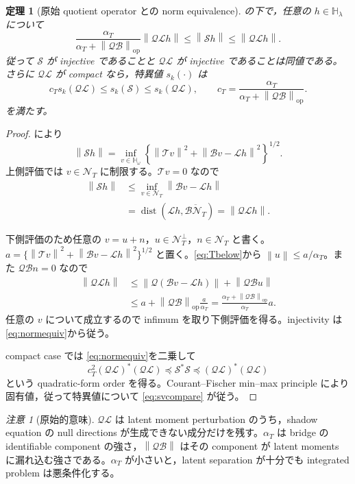 \documentclass[11pt,a4paper]{ltjsarticle}
\newtheorem{theorem}{定理}[section]
\theoremstyle{remark}
\newtheorem{remark}{注意}[section]
\newcommand{\norm}[1]{\left\lVert#1\right\rVert}
\newcommand{\cN}{\mathcal N}
\newcommand{\Top}{\mathscr T}
\newcommand{\Bop}{\mathscr B}
\newcommand{\Lop}{\mathscr L}
\newcommand{\Sop}{\mathscr S}
\newcommand{\Qop}{\mathscr Q}
\newcommand{\dist}{\operatorname{dist}}
\newcommand{\op}{\operatorname{op}}
\begin{document}
\begin{theorem}[原始 quotient operator との norm equivalence]\label{thm:primitiveSV}
の下で，任意の $h\in\mathbb H_\lambda$ について
\begin{equation}
\frac{\alpha_T}{\alpha_T+\norm{\Qop\Bop}_{\op}}
\norm{\Qop\Lop h}
\le
\norm{\Sop h}
\le
\norm{\Qop\Lop h}.
\label{eq:normequiv}
\end{equation}
従って $\Sop$ が injective であることと $\Qop\Lop$ が injective であることは同値である。さらに $\Qop\Lop$ が compact なら，特異値 $s_k(\cdot)$ は
\begin{equation}
 c_T s_k(\Qop\Lop)
\le s_k(\Sop)\le s_k(\Qop\Lop),
\qquad
c_T=\frac{\alpha_T}{\alpha_T+\norm{\Qop\Bop}_{\op}}.
\label{eq:svcompare}
\end{equation}
を満たす。
\end{theorem}

\begin{proof}
により
\[
\norm{\Sop h}
=\inf_{v\in\mathbb H_\omega}
\left\{\norm{\Top v}^2+\norm{\Bop v-\Lop h}^2\right\}^{1/2}.
\]
上側評価では $v\in\cN_T$ に制限する。$\Top v=0$ なので
\begin{align*}
\norm{\Sop h}
&\le \inf_{v\in\cN_T}\norm{\Bop v-\Lop h}\\
&=\dist(\Lop h,\overline{\Bop\cN_T})
=\norm{\Qop\Lop h}.
\end{align*}

下側評価のため任意の $v=u+n$，$u\in\cN_T^\perp$，$n\in\cN_T$ と書く。$a=\{\norm{\Top v}^2+\norm{\Bop v-\Lop h}^2\}^{1/2}$ と置く。\eqref{eq:Tbelow}から $\norm u\le a/\alpha_T$。また $\Qop\Bop n=0$ なので
\begin{align*}
\norm{\Qop\Lop h}
&\le\norm{\Qop(\Bop v-\Lop h)}+\norm{\Qop\Bop u}\\
&\le a+\norm{\Qop\Bop}_{\op}\frac{a}{\alpha_T}
=\frac{\alpha_T+\norm{\Qop\Bop}_{\op}}{\alpha_T}a.
\end{align*}
任意の $v$ について成立するので infimum を取り下側評価を得る。injectivity は \eqref{eq:normequiv}から従う。

compact case では \eqref{eq:normequiv}を二乗して
\[
c_T^2(\Qop\Lop)^*(\Qop\Lop)
\preceq \Sop^*\Sop
\preceq (\Qop\Lop)^*(\Qop\Lop)
\]
という quadratic-form order を得る。Courant--Fischer min--max principle により固有値，従って特異値について \eqref{eq:svcompare} が従う。
\end{proof}

\begin{remark}[原始的意味]
$\Qop\Lop$ は latent moment perturbation のうち，shadow equation の null directions が生成できない成分だけを残す。$\alpha_T$ は bridge の identifiable component の強さ，$\norm{\Qop\Bop}$ はその component が latent moments に漏れ込む強さである。$\alpha_T$ が小さいと，latent separation が十分でも integrated problem は悪条件化する。
\end{remark}
\end{document}
